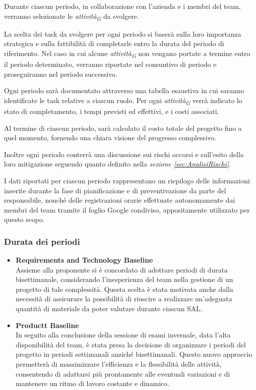 Durante ciascun periodo, in collaborazione con l'azienda e i membri del team, verranno selezionate le \textit{attività}\textsubscript{\textit{G}} da svolgere.

La scelta dei task da svolgere per ogni periodo si baserà sulla loro importanza strategica e sulla fattibilità di completarle entro la durata del periodo di riferimento. Nel caso in cui alcune \textit{attività}\textsubscript{\textit{G}} non vengano portate a termine entro il periodo determinato, verranno riportate nel consuntivo di periodo e proseguiranno nel periodo successivo.

Ogni periodo sarà documentato attraverso una tabella esaustiva in cui saranno identificate le task relative a ciascun ruolo. Per ogni \textit{attività}\textsubscript{\textit{G}} verrà indicato lo stato di completamento, i tempi previsti ed effettivi, e i costi associati.

Al termine di ciascun periodo, sarà calcolato il costo totale del progetto fino a quel momento, fornendo una chiara visione del progresso complessivo.

Inoltre ogni periodo conterrà una discussione sui rischi occorsi e sull'esito della loro mitigazione seguendo quanto definito nella \textit{sezione \ref{sec:AnalisiRischi}}.

I dati riportati per ciascun periodo rappresentano un riepilogo delle informazioni inserite durante la fase di pianificazione e di preventivazione da parte del responsabile, nonché delle registrazioni orarie effettuate autonomamente dai membri del team tramite il foglio Google condiviso, appositamente utilizzato per questo scopo.

\subsubsection{Durata dei periodi}
\begin{itemize}
    \item \textbf{Requirements and Technology Baseline} \\
    Assieme alla proponente si è concordato di adottare periodi di durata bisettimanale, considerando l'inesperienza del team nella gestione di un progetto di tale complessità. Questa scelta è stata motivata anche dalla necessità di assicurare la possibilità di riuscire a realizzare un'adeguata quantità di materiale da poter valutare durante ciascun SAL.
    \item \textbf{Productt Baseline} \\
    In seguito alla conclusione della sessione di esami invernale, data l'alta disponibilità del team, è stata presa la decisione di organizzare i periodi del progetto in periodi settimanali anziché bisettimanali. Questo nuovo approccio permetterà di massimizzare l'efficienza e la flessibilità delle attività, consentendo di adattarsi più prontamente alle eventuali variazioni e di mantenere un ritmo di lavoro costante e dinamico.
\end{itemize}

